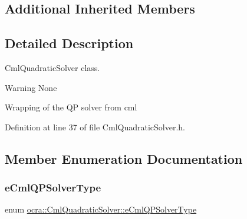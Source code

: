 \subsection*{Additional Inherited Members}


\subsection{Detailed Description}
Cml\+Quadratic\+Solver class. 

\begin{DoxyWarning}{Warning}
None
\end{DoxyWarning}
Wrapping of the QP solver from cml 

Definition at line 37 of file Cml\+Quadratic\+Solver.\+h.



\subsection{Member Enumeration Documentation}
\hypertarget{classocra_1_1CmlQuadraticSolver_a6d54dc2e4dac085099b002c88cb6d3df}{}\label{classocra_1_1CmlQuadraticSolver_a6d54dc2e4dac085099b002c88cb6d3df} 
\subsubsection{\texorpdfstring{e\+Cml\+Q\+P\+Solver\+Type}{eCmlQPSolverType}}
{\footnotesize\ttfamily enum \hyperlink{classocra_1_1CmlQuadraticSolver_a6d54dc2e4dac085099b002c88cb6d3df}{ocra\+::\+Cml\+Quadratic\+Solver\+::e\+Cml\+Q\+P\+Solver\+Type}}

